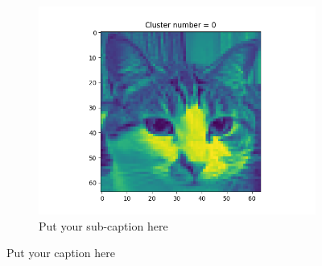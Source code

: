 \documentclass{article}
\begin{document}
\begin{figure}[ht]
\begin{subfigure}{.33\textwidth}
  \includegraphics[width=1\linewidth]{1d/Cats/Example clust 0.png}  
  \caption{Put your sub-caption here}
  \label{fig:sub-second}
\end{subfigure}
\caption{Put your caption here}
\label{example cat}
\end{figure}
\end{document}
